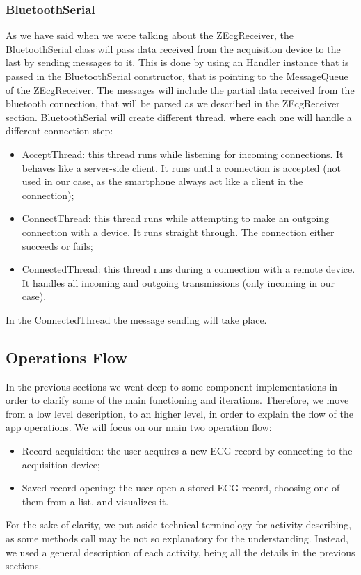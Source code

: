 \subsubsection{BluetoothSerial}
As we have said when we were talking about the ZEcgReceiver, the BluetoothSerial class will pass data received from the acquisition device to the last by sending messages to it. This is done by using an Handler instance that is passed in the BluetoothSerial constructor, that is pointing to the MessageQueue of the ZEcgReceiver. The messages will include the partial data received from the bluetooth connection, that will be parsed as we described in the ZEcgReceiver section. BluetoothSerial will create different thread, where each one will handle a different connection step:
\begin{itemize}
	\item AcceptThread: this thread runs while listening for incoming connections. It behaves like a server-side client. It runs until a connection is accepted (not used in our case, as the smartphone always act like a client in the connection);
	\item ConnectThread: this thread runs while attempting to make an outgoing connection with a device. It runs straight through. The connection either succeeds or fails;
	\item ConnectedThread: this thread runs during a connection with a remote device. It handles all incoming and outgoing transmissions (only incoming in our case).
\end{itemize}
In the ConnectedThread the message sending will take place.

\subsection{Operations Flow}
In the previous sections we went deep to some component implementations in order to clarify some of the main functioning and iterations. Therefore, we move from a low level description, to an higher level, in order to explain the flow of the app operations. We will focus on our main two operation flow:
\begin{itemize}
	\item Record acquisition: the user acquires a new ECG record by connecting to the acquisition device;
	\item Saved record opening: the user open a stored ECG record, choosing one of them from a list, and visualizes it.
\end{itemize}
For the sake of clarity, we put aside technical terminology for activity describing, as some methods call may be not so explanatory for the understanding. Instead, we used a general description of each activity, being all the details in the previous sections.

